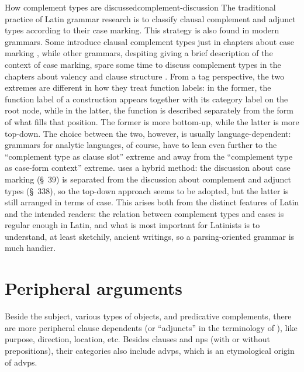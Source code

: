 \documentclass[UTF8, a4paper, oneside]{report}
\newcommand*{\citesec}[1]{\S~{#1}}
\newcommand*{\citechap}[1]{chap.~{#1}}
\begin{document}
\begin{theorybox}{How complement types are discussed}{complement-discussion}
    The traditional practice of Latin grammar research
    is to classify clausal complement and adjunct types according to their case marking.
    This strategy is also found in modern grammars.
    Some introduce clausal complement types just in chapters about case marking 
    \citep[\citechap{8}]{jacques2021grammar},
    while other grammars, despiting giving a brief description of the context of case marking,
    spare some time to discuss complement types in the chapters about valency and clause structure 
    \citep[\citesec{3.4}, \citechap{19}, \citechap{22}]{forker2020grammar}.
    From a \ac{tag} perspective, 
    the two extremes are different in how they treat function labels:
    in the former, the function label of a construction appears together with its category label on the root node,
    while in the latter, the function is described separately from the form of what fills that position.
    The former is more bottom-up, 
    while the latter is more top-down.
    The choice between the two, however, is usually language-dependent:
    grammars for analytic languages, of course, have to lean even further to the 
    ``complement type as clause slot'' extreme 
    and away from the ``complement type as case-form context'' extreme.
    \citet{allen1903allen} uses a hybrid method:
    the discussion about case marking (\citesec{39}) is separated from 
    the discussion about complement and adjunct types (\citesec{338}),
    so the top-down approach seems to be adopted,
    but the latter is still arranged in terms of case.
    This arises both from the distinct features of Latin and the intended readers:
    the relation between complement types and cases is regular enough in Latin,
    and what is most important for Latinists is to understand, at least sketchily, ancient writings, 
    so a parsing-oriented grammar is much handier.
\end{theorybox}

\section{Peripheral arguments}

Beside the subject, various types of objects, and predicative complements,
there are more peripheral clause dependents
(or ``adjuncts'' in the terminology of \citet{cgel}),
like purpose, direction, location, etc.
Besides clauses and \ac{np}s (with or without prepositions),
their categories also include \ac{advp}s,
which is an etymological origin of \ac{advp}s.
\end{document}
